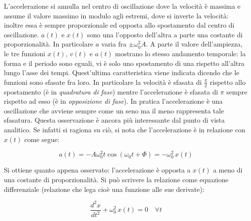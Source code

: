 L'accelerazione si annulla nel centro di oscillazione dove la velocità è massima e assume il valore massimo in modulo agli estremi, dove si inverte la velocità: inoltre essa è sempre proporzionale ed opposta allo spostamento dal centro di oscillazione. $a(t)$ e $x(t)$ sono una l'opposto dell'altra a parte una costante di proporzionalità. In particolare $a$ varia fra $\pm \omega^2_0 A$.
A parte il valore dell'ampiezza, le tre funzioni $x(t)$, $v(t)$ e $a(t)$ mostrano lo stesso andamento temporale: la forma e il periodo sono eguali, vi è solo uno spostamento di una rispetto all'altra lungo l'asse dei tempi. Quest'ultima caratteristica viene indicata dicendo che le funzioni sono sfasate fra loro.
In particolare la velocità è sfasata di $\frac{\pi}{2}$ rispetto allo spostamento (è in \emph{quadratura di fase}) mentre l'accelerazione è sfasata di $\pi$ sempre rispetto ad esso (è in \emph{opposizione di fase}). In pratica l'accelerazione è una oscillazione che avviene sempre come un seno ma il meno rappresenta tale sfasatura. Questa osservazione è ancora più interessante dal punto di vista analitico. Se infatti si ragiona su ciò, si nota che l'accelerazione è in relazione con $x(t)$ come segue:

\[
	a(t)=-A\omega^2_0 t\cos(\omega_0 t+\Phi)=-\omega^2_0\,x(t)
\]

Si ottiene quanto appena osservato: l'accelerazione è opposta a $x(t)$ a meno di una costante di proporzionalità.
Si può scrivere la relazione come equazione differenziale (relazione che lega cioè una funzione alle sue derivate):

\[
	\frac{d^2x}{dt^2}+\omega^2_0\,x(t)=0 \quad \forall t
\]

